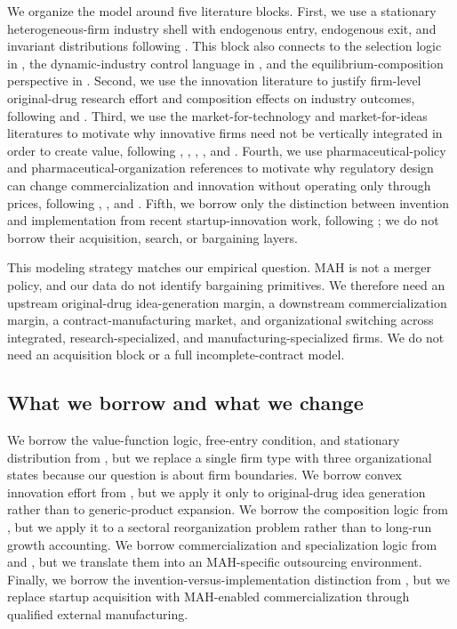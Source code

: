 \documentclass[12pt]{article}
\newcommand{\1}{\mathbf{1}}
\begin{document}
We organize the model around five literature blocks. First, we use a stationary heterogeneous-firm industry shell with endogenous entry, endogenous exit, and invariant distributions following \citet{Hopenhayn1992}. This block also connects to the selection logic in \citet{Jovanovic1982}, the dynamic-industry control language in \citet{EricsonPakes1995}, and the equilibrium-composition perspective in \citet{Luttmer2007}. Second, we use the innovation literature to justify firm-level original-drug research effort and composition effects on industry outcomes, following \citet{KletteKortum2004} and \citet{AkcigitKerr2018}. Third, we use the market-for-technology and market-for-ideas literatures to motivate why innovative firms need not be vertically integrated in order to create value, following \citet{AroraFosfuriGambardella2001}, \citet{AroraMerges2004}, \citet{GansStern2000}, \citet{GansStern2003}, and \citet{GansHsuStern2008}. Fourth, we use pharmaceutical-policy and pharmaceutical-organization references to motivate why regulatory design can change commercialization and innovation without operating only through prices, following \citet{Lakdawalla2018}, \citet{ChandraEtAl2026}, and \citet{JiaMaYangZhang2023}. Fifth, we borrow only the distinction between invention and implementation from recent startup-innovation work, following \citet{FonsRosenRoldanBlancoSchmitz2026}; we do not borrow their acquisition, search, or bargaining layers.

This modeling strategy matches our empirical question. MAH is not a merger policy, and our data do not identify bargaining primitives. We therefore need an upstream original-drug idea-generation margin, a downstream commercialization margin, a contract-manufacturing market, and organizational switching across integrated, research-specialized, and manufacturing-specialized firms. We do not need an acquisition block or a full incomplete-contract model.

\subsection{What we borrow and what we change}

We borrow the value-function logic, free-entry condition, and stationary distribution from \citet{Hopenhayn1992}, but we replace a single firm type with three organizational states because our question is about firm boundaries. We borrow convex innovation effort from \citet{KletteKortum2004}, but we apply it only to original-drug idea generation rather than to generic-product expansion. We borrow the composition logic from \citet{AkcigitKerr2018}, but we apply it to a sectoral reorganization problem rather than to long-run growth accounting. We borrow commercialization and specialization logic from \citet{AroraMerges2004} and \citet{GansStern2003}, but we translate them into an MAH-specific outsourcing environment. Finally, we borrow the invention-versus-implementation distinction from \citet{FonsRosenRoldanBlancoSchmitz2026}, but we replace startup acquisition with MAH-enabled commercialization through qualified external manufacturing.
\end{document}
